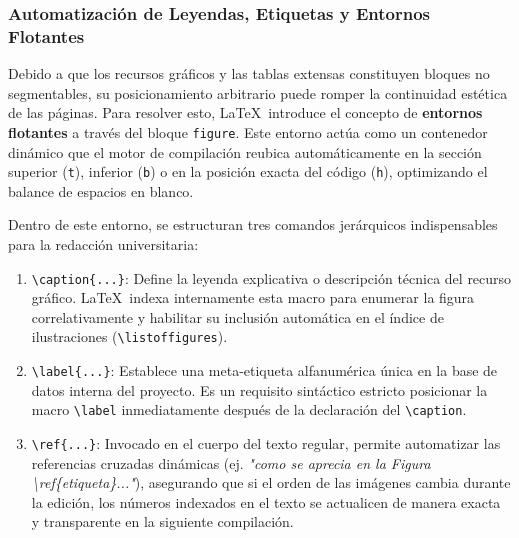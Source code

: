 \subsubsection{Automatización de Leyendas, Etiquetas y Entornos Flotantes}
Debido a que los recursos gráficos y las tablas extensas constituyen bloques no segmentables, su posicionamiento arbitrario puede romper la continuidad estética de las páginas. Para resolver esto, \LaTeX\ introduce el concepto de \textbf{entornos flotantes} a través del bloque \texttt{figure}. Este entorno actúa como un contenedor dinámico que el motor de compilación reubica automáticamente en la sección superior (\texttt{t}), inferior (\texttt{b}) o en la posición exacta del código (\texttt{h}), optimizando el balance de espacios en blanco.

Dentro de este entorno, se estructuran tres comandos jerárquicos indispensables para la redacción universitaria:
\begin{enumerate}
    \item \texttt{\textbackslash caption\{...\}}: Define la leyenda explicativa o descripción técnica del recurso gráfico. \LaTeX\ indexa internamente esta macro para enumerar la figura correlativamente y habilitar su inclusión automática en el índice de ilustraciones (\texttt{\textbackslash listoffigures}).
    \item \texttt{\textbackslash label\{...\}}: Establece una meta-etiqueta alfanumérica única en la base de datos interna del proyecto. Es un requisito sintáctico estricto posicionar la macro \texttt{\textbackslash label} inmediatamente después de la declaración del \texttt{\textbackslash caption}.
    \item \texttt{\textbackslash ref\{...\}}: Invocado en el cuerpo del texto regular, permite automatizar las referencias cruzadas dinámicas (ej. \textit{"como se aprecia en la Figura \textbackslash ref\{etiqueta\}..."}), asegurando que si el orden de las imágenes cambia durante la edición, los números indexados en el texto se actualicen de manera exacta y transparente en la siguiente compilación.
\end{enumerate}